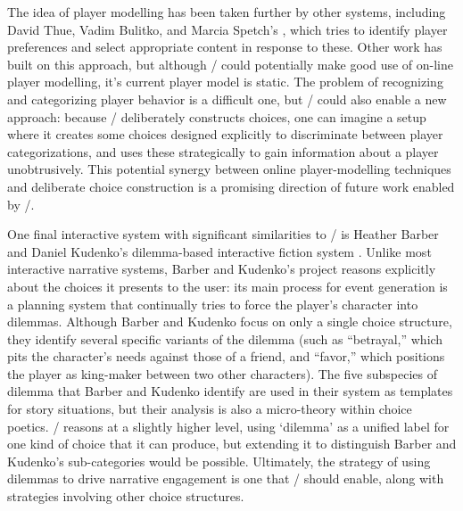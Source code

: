 The idea of player modelling has been taken further by other systems, including  David Thue, Vadim Bulitko, and Marcia Spetch's  \citep{Thue2008}, which tries to identify player preferences and select appropriate content in response to these.
%
Other work has built on this approach, but although \dunyazad/ could potentially make good use of on-line player modelling, it's current player model is static.
%
The problem of recognizing and categorizing player behavior is a difficult one, but \dunyazad/ could also enable a new approach: because \dunyazad/ deliberately constructs choices, one can imagine a setup where it creates some choices designed explicitly to discriminate between player categorizations, and uses these strategically to gain information about a player unobtrusively.
%
This potential synergy between online player-modelling techniques and deliberate choice construction is a promising direction of future work enabled by \dunyazad/.


One final interactive system with significant similarities to \dunyazad/ is Heather Barber and Daniel Kudenko's dilemma-based interactive fiction system \citep{Barber2007a,Barber2007b}.
%
Unlike most interactive narrative systems, Barber and Kudenko's project reasons explicitly about the choices it presents to the user: its main process for event generation is a planning system that continually tries to force the player's character into dilemmas.
%
Although Barber and Kudenko focus on only a single choice structure, they identify several specific variants of the dilemma (such as ``betrayal,'' which pits the character's needs against those of a friend, and ``favor,'' which positions the player as king-maker between two other characters).
%
The five subspecies of dilemma that Barber and Kudenko identify are used in their system as templates for story situations, but their analysis is also a micro-theory within choice poetics.
%
\dunyazad/ reasons at a slightly higher level, using `dilemma' as a unified label for one kind of choice that it can produce, but extending it to distinguish Barber and Kudenko's sub-categories would be possible.
%
Ultimately, the strategy of using dilemmas to drive narrative engagement is one that \dunyazad/ should enable, along with strategies involving other choice structures.




